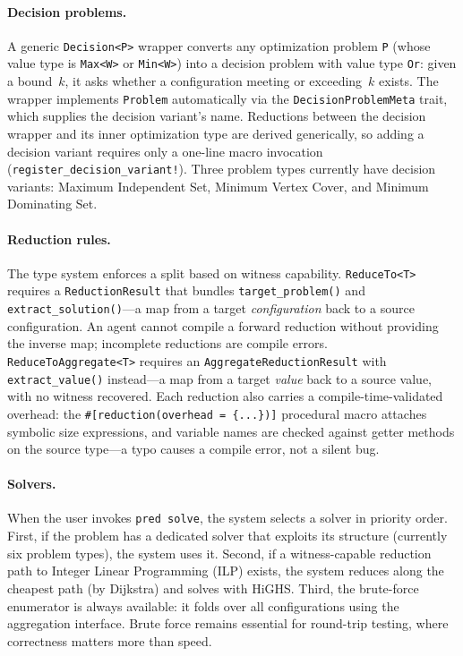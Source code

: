 \documentclass[conference]{IEEEtran}
\begin{document}
\paragraph{Decision problems.}
A generic \texttt{Decision<P>} wrapper converts any optimization problem \texttt{P} (whose value type is \texttt{Max<W>} or \texttt{Min<W>}) into a decision problem with value type \texttt{Or}: given a bound~$k$, it asks whether a configuration meeting or exceeding~$k$ exists.
The wrapper implements \texttt{Problem} automatically via the \texttt{DecisionProblemMeta} trait, which supplies the decision variant's name.
Reductions between the decision wrapper and its inner optimization type are derived generically, so adding a decision variant requires only a one-line macro invocation (\texttt{register\_decision\_variant!}).
Three problem types currently have decision variants: Maximum Independent Set, Minimum Vertex Cover, and Minimum Dominating Set.

\paragraph{Reduction rules.}
The type system enforces a split based on witness capability.
\texttt{ReduceTo<T>} requires a \texttt{ReductionResult} that bundles \texttt{target\_problem()} and \texttt{extract\_solution()}---a map from a target \emph{configuration} back to a source configuration.
An agent cannot compile a forward reduction without providing the inverse map; incomplete reductions are compile errors.
\texttt{ReduceToAggregate<T>} requires an \texttt{AggregateReductionResult} with \texttt{extract\_value()} instead---a map from a target \emph{value} back to a source value, with no witness recovered.
Each reduction also carries a compile-time-validated overhead: the \texttt{\#[reduction(overhead = \{...\})]} procedural macro attaches symbolic size expressions, and variable names are checked against getter methods on the source type---a typo causes a compile error, not a silent bug.

\paragraph{Solvers.}
When the user invokes \texttt{pred solve}, the system selects a solver in priority order.
First, if the problem has a dedicated solver that exploits its structure (currently six problem types), the system uses it.
Second, if a witness-capable reduction path to Integer Linear Programming (ILP) exists, the system reduces along the cheapest path (by Dijkstra) and solves with HiGHS.
Third, the brute-force enumerator is always available: it folds over all configurations using the aggregation interface.
Brute force remains essential for round-trip testing, where correctness matters more than speed.
\end{document}
